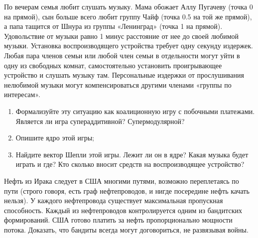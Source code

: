 \begin{problem}
\begin{source}
\cite{savva:nmu}
\end{source}
 По вечерам семья любит слушать музыку. Мама обожает Аллу Пугачеву (точка 0 на прямой), сын больше всего любит группу Чайф (точка 0.5 на той же прямой), а папа тащится от Шнура из группы «Ленинград» (точка 1 на прямой). Удовольствие от музыки равно 1 минус расстояние от нее до своей любимой музыки.
Установка воспроизводящего устройства требует одну секунду издержек. Любая пара членов семьи или любой член семьи в отдельности могут уйти в одну из свободных комнат, самостоятельно установить проигрывающее устройство и слушать музыку там. Персональные издержки от прослушивания нелюбимой музыки могут компенсироваться другими членами «группы по интересам».
\begin{enumerate}
\item Формализуйте эту ситуацию как коалиционную игру с побочными платежами. Является ли игра супераддитивной? Супермодулярной?
\item Опишите ядро этой игры;
\item Найдите вектор Шепли этой игры. Лежит ли он в ядре? Какая музыка будет играть и где? Кто сколько вносит средств на воспроизводящее устройство?
\end{enumerate}


\begin{sol}

\end{sol}
\end{problem}




\begin{problem}
\begin{source}
\cite{savva:nmu}
\end{source}
 Нефть из Ирака следует в США многими путями, возможно переплетаясь по пути (строго говоря, есть граф нефтепроводов, и нигде посередине нефть качать нельзя). У каждого нефтепровода существует максимальная пропускная способность. Каждый из нефтепроводов контролируется одним из бандитских формирований. США готово платить за нефть пропорционально мощности потока. Доказать, что бандиты всегда могут договориться, не развязывая войны.






\begin{sol}

\end{sol}
\end{problem}




